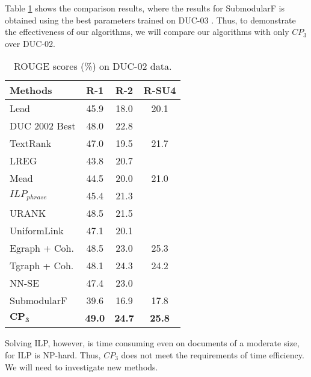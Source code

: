 \documentclass[a4paper,twoside]{article}
\begin{document}
Table \ref{CP3} shows the comparison results, where the results for SubmodularF
is obtained using
the best parameters trained on DUC-03 \cite{lin:11}.
Thus, to demonstrate the effectiveness of our algorithms, we will compare our algorithms with only $CP_3$ %
over DUC-02.
\begin{table}[h]
\begin{center}
\caption{\label{CP3} ROUGE scores (\%) on DUC-02 data.}
\begin{tabular}{l|c|c|c}
\hline
\bf Methods & \bf R-1 & \bf R-2 & \bf R-SU4 \\
\hline
Lead & 45.9 & 18.0 & 20.1 \\
DUC 2002 Best & 48.0 & 22.8 & \\
TextRank & 47.0 & 19.5 & 21.7 \\
LREG & 43.8 & 20.7 & \\
Mead & 44.5 & 20.0 & 21.0 \\
$ILP_{phrase}$ & 45.4 & 21.3 & \\
URANK & 48.5 & 21.5 & \\
UniformLink & 47.1 & 20.1 &   \\
Egraph + Coh. & 48.5 & 23.0 & 25.3  \\
Tgraph + Coh. & 48.1 & 24.3 & 24.2 \\
NN-SE & 47.4 & 23.0 & \\
SubmodularF & 39.6 & 16.9 & 17.8 \\
$\bm{CP_3}$& \bf 49.0 & \bf 24.7 & \bf 25.8  \\
\hline
\end{tabular}

\end{center}
\end{table}

Solving ILP, however, is
time consuming even on documents of a moderate size, for ILP is NP-hard.
%
Thus, $CP_3$ does not meet the requirements of time efficiency. We will need to investigate new methods.
\end{document}
